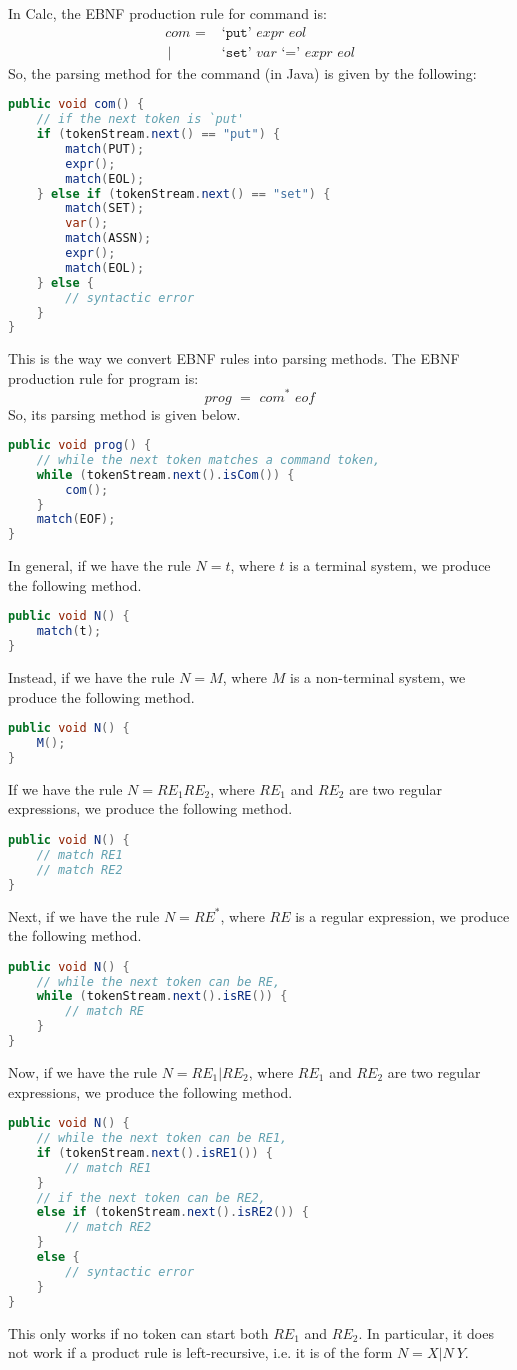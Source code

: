 \documentclass[a4paper, openany]{memoir}
\begin{document}
In Calc, the EBNF production rule for command is:
\begin{align*}
    \textit{com } =& \text{ `}\texttt{put}\text{'} \textit{ expr eol} \\
    \hspace{2pt} |& \text{ `}\texttt{set}\text{'} \textit{ var } \text{`}\texttt{=}\text{'} \textit{ expr eol}
\end{align*}
So, the parsing method for the command (in Java) is given by the following:
\begin{lstlisting}[language=java]
public void com() {
    // if the next token is `put'
    if (tokenStream.next() == "put") {
        match(PUT);
        expr();
        match(EOL);
    } else if (tokenStream.next() == "set") {
        match(SET);
        var();
        match(ASSN);
        expr();
        match(EOL);
    } else {
        // syntactic error
    }
}
\end{lstlisting}
This is the way we convert EBNF rules into parsing methods. The EBNF production rule for program is:
\[\textit{prog } = \textit{ com}^* \textit{ eof}\]
So, its parsing method is given below.
\begin{lstlisting}[language=java]
public void prog() {
    // while the next token matches a command token,
    while (tokenStream.next().isCom()) {
        com();
    }
    match(EOF);
}
\end{lstlisting}
In general, if we have the rule $N = t$, where $t$ is a terminal system, we produce the following method.
\begin{lstlisting}[language=java]
public void N() {
    match(t);
}
\end{lstlisting}
Instead, if we have the rule $N = M$, where $M$ is a non-terminal system, we produce the following method.
\begin{lstlisting}[language=java]
public void N() {
    M();
}
\end{lstlisting}
If we have the rule $N = RE_1 RE_2$, where $RE_1$ and $RE_2$ are two regular expressions, we produce the following method.
\begin{lstlisting}[language=java]
public void N() {
    // match RE1
    // match RE2
}
\end{lstlisting}
Next, if we have the rule $N = RE^*$, where $RE$ is a regular expression, we produce the following method.
\begin{lstlisting}[language=java]
public void N() {
    // while the next token can be RE,
    while (tokenStream.next().isRE()) {
        // match RE
    }
}
\end{lstlisting}
Now, if we have the rule $N = RE_1 | RE_2$, where $RE_1$ and $RE_2$ are two regular expressions, we produce the following method.
\begin{lstlisting}[language=java]
public void N() {
    // while the next token can be RE1,
    if (tokenStream.next().isRE1()) {
        // match RE1
    }
    // if the next token can be RE2,
    else if (tokenStream.next().isRE2()) {
        // match RE2
    }
    else {
        // syntactic error
    }
}
\end{lstlisting}
This only works if no token can start both $RE_1$ and $RE_2$. In particular, it does not work if a product rule is left-recursive, i.e. it is of the form $N = X | N \ Y$.
\end{document}
